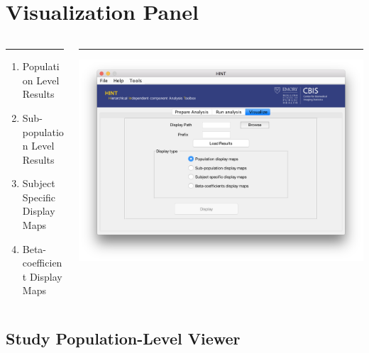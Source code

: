 \documentclass[11pt]{beamer}
\begin{document}
\section{Visualization Panel}

\begin{frame}
\begin{columns}[T] %
	\begin{column}{.4\textwidth}
		\color{black}\rule{\linewidth}{0pt}
		
\begin{enumerate}
\item Population Level Results
\item Sub-population Level Results
\item Subject Specific Display Maps
\item Beta-coefficient Display Maps
\end{enumerate}
		
	\end{column}%
	\hfill%
	\begin{column}{.6\textwidth}
		\color{blue}\rule{\linewidth}{0pt}
		\includegraphics[width=1.2\linewidth]{figs/panel3empty}
	\end{column}%
\end{columns}
\end{frame}

\subsection{Study Population-Level Viewer}
\end{document}
